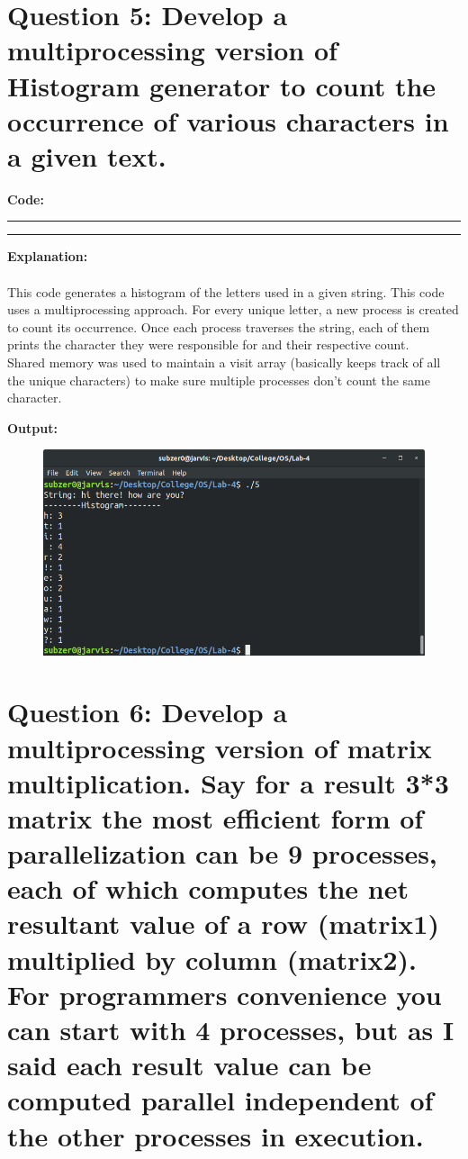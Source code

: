 \documentclass{article}
\begin{document}
\bigskip



\section*{Question 5: Develop a multiprocessing version of Histogram generator to count the occurrence of various characters in a given text.}
\bigskip

\textbf{\Large Code:}
\smallskip
\par\noindent\rule{\textwidth}{0.4pt}

\par\noindent\rule{\textwidth}{0.4pt}

\bigskip
\noindent
\textbf{\Large Explanation: } \\
  \\This code generates a histogram of the letters used in a given string. This
  code uses a multiprocessing approach. For every unique letter, a new process 
  is created to count its occurrence. Once each process traverses the string, 
  each of them prints the character they were responsible for and their respective
  count.
  \\Shared memory was used to maintain a visit array (basically keeps track of 
  all the unique characters) to make sure multiple processes don't count the same 
  character.

\bigskip
\noindent
\textbf{\Large Output:}

\begin{figure}[h]
	\includegraphics[width=\textwidth]{output/5.png}
\end{figure}
\bigskip
\bigskip
\bigskip

\bigskip


\section*{Question 6: Develop a multiprocessing version of matrix multiplication. Say for a result 3*3 matrix the most efficient form of parallelization can be 9 processes, each of which computes the net resultant value of a row (matrix1) multiplied by column (matrix2). For programmers convenience you can start with 4 processes, but as I said each result value can be computed parallel independent of the other processes in execution.}
\bigskip
\end{document}
